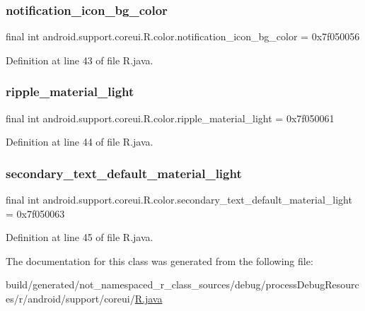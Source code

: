 \subsubsection{\texorpdfstring{notification\_icon\_bg\_color}{notification\_icon\_bg\_color}}
{\footnotesize\ttfamily final int android.\+support.\+coreui.\+R.\+color.\+notification\+\_\+icon\+\_\+bg\+\_\+color = 0x7f050056\hspace{0.3cm}{\ttfamily [static]}}



Definition at line 43 of file R.\+java.

\mbox{\label{classandroid_1_1support_1_1coreui_1_1_r_1_1color_a6749089d8e376ef1b30cb30a2659fbc3}} 
\subsubsection{\texorpdfstring{ripple\_material\_light}{ripple\_material\_light}}
{\footnotesize\ttfamily final int android.\+support.\+coreui.\+R.\+color.\+ripple\+\_\+material\+\_\+light = 0x7f050061\hspace{0.3cm}{\ttfamily [static]}}



Definition at line 44 of file R.\+java.

\mbox{\label{classandroid_1_1support_1_1coreui_1_1_r_1_1color_ae66a1bd3e1349c908b8345515b469985}} 
\subsubsection{\texorpdfstring{secondary\_text\_default\_material\_light}{secondary\_text\_default\_material\_light}}
{\footnotesize\ttfamily final int android.\+support.\+coreui.\+R.\+color.\+secondary\+\_\+text\+\_\+default\+\_\+material\+\_\+light = 0x7f050063\hspace{0.3cm}{\ttfamily [static]}}



Definition at line 45 of file R.\+java.



The documentation for this class was generated from the following file\+:\begin{DoxyCompactItemize}
\item 
build/generated/not\+\_\+namespaced\+\_\+r\+\_\+class\+\_\+sources/debug/process\+Debug\+Resources/r/android/support/coreui/\mbox{\hyperlink{android_2support_2coreui_2_r_8java}{R.\+java}}\end{DoxyCompactItemize}
